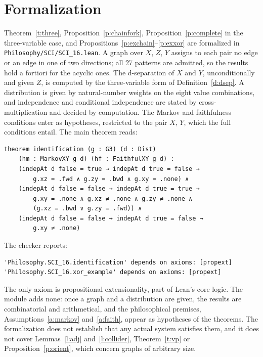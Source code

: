\documentclass{situationist-preprint}
\begin{document}
\section{Formalization}\label{s:formal}

Theorem~\ref{t:three}, Proposition~\ref{p:chainfork}, Proposition~\ref{p:complete} in the three-variable case, and Propositions~\ref{p:exchain}--\ref{p:exxor} are formalized in \nolinkurl{Philosophy/SCI/SCI_16.lean}. A graph over $X$, $Z$, $Y$ assigns to each pair no edge or an edge in one of two directions; all 27 patterns are admitted, so the results hold a fortiori for the acyclic ones. The d-separation of $X$ and $Y$, unconditionally and given $Z$, is computed by the three-variable form of Definition~\ref{d:dsep}. A distribution is given by natural-number weights on the eight value combinations, and independence and conditional independence are stated by cross-multiplication and decided by computation. The Markov and faithfulness conditions enter as hypotheses, restricted to the pair $X$, $Y$, which the full conditions entail. The main theorem reads:

\begin{lstlisting}
theorem identification (g : G3) (d : Dist)
    (hm : MarkovXY g d) (hf : FaithfulXY g d) :
    (indepAt d false = true → indepAt d true = false →
        g.xz = .fwd ∧ g.zy = .bwd ∧ g.xy = .none) ∧
    (indepAt d false = false → indepAt d true = true →
        g.xy = .none ∧ g.xz ≠ .none ∧ g.zy ≠ .none ∧
        (g.xz = .bwd ∨ g.zy = .fwd)) ∧
    (indepAt d false = false → indepAt d true = false →
        g.xy ≠ .none)
\end{lstlisting}

\noindent The checker reports:

\begin{lstlisting}
'Philosophy.SCI_16.identification' depends on axioms: [propext]
'Philosophy.SCI_16.xor_example' depends on axioms: [propext]
\end{lstlisting}

\noindent The only axiom is propositional extensionality, part of Lean's core logic. The module adds none: once a graph and a distribution are given, the results are combinatorial and arithmetical, and the philosophical premises, Assumptions~\ref{a:markov} and~\ref{a:faith}, appear as hypotheses of the theorems. The formalization does not establish that any actual system satisfies them, and it does not cover Lemmas~\ref{l:adj} and~\ref{l:collider}, Theorem~\ref{t:vp} or Proposition~\ref{p:orient}, which concern graphs of arbitrary size.
\end{document}
